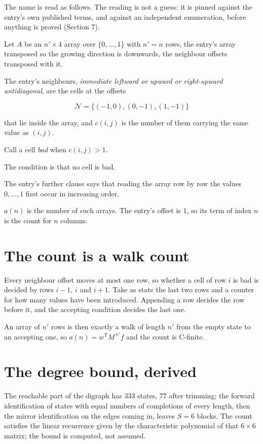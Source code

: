 \documentclass[11pt]{article}
\theoremstyle{definition}
\begin{document}
The name is read as follows. The reading is not a guess: it is pinned against the entry's own published terms, and against an independent enumeration, before anything is proved (Section 7).

Let $A$ be an $n' \times 4$ array over $\{0,\dots,1\}$ with $n' = n$ rows, the entry's array transposed so the growing direction is downwards, the neighbour offsets transposed with it.

The entry's neighbours, {\itshape immediate leftward or upward or right-upward antidiagonal}, are the cells at the offsets

\[\mathcal{N} = \{(-1,0), (0,-1), (1,-1)\}\]

that lie inside the array, and $c(i,j)$ is the number of them carrying the same value as $(i,j)$.

Call a cell {\itshape bad} when $c(i,j) > 1$.

The condition is that no cell is bad.

The entry's further clause says that reading the array row by row the values $0,\dots,1$ first occur in increasing order.

$a(n)$ is the number of such arrays. The entry's offset is 1, so its term of index $n$ is the count for $n$ columns.

\section{The count is a walk count}

Every neighbour offset moves at most one row, so whether a cell of row $i$ is bad is decided by rows $i-1$, $i$ and $i+1$. Take as state the last two rows and a counter for how many values have been introduced. Appending a row decides the row before it, and the accepting condition decides the last one.

An array of $n'$ rows is then exactly a walk of length $n'$ from the empty state to an accepting one, so $a(n) = w^{\mathsf T}M^{\,n'}f$ and the count is C-finite.

\section{The degree bound, derived}

The reachable part of the digraph has $333$ states, $77$ after trimming; the forward identification of states with equal numbers of completions of every length, then the mirror identification on the edges coming in, leaves $S = 6$ blocks. The count satisfies the linear recurrence given by the characteristic polynomial of that $6\times6$ matrix; the bound is computed, not assumed.
\end{document}
